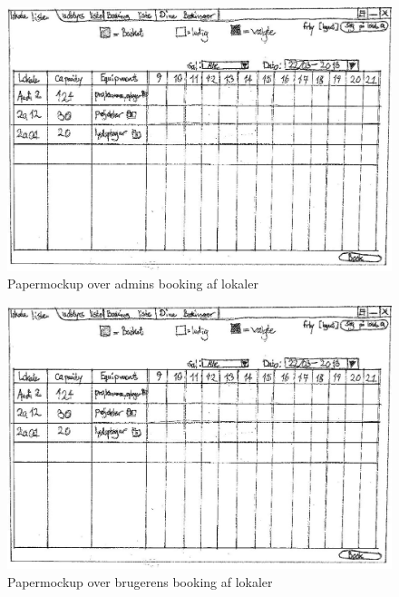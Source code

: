 \begin{figure}[h!]
  \centering
    \includegraphics[width=\textwidth]{Appendix/GUI-Prototype/PaperMockup/LokaleListeSuper_001}
  \caption{Papermockup over admins booking af lokaler}
\label{App_GUI_paper_LokaleListeSuper}
\end{figure}

\begin{figure}[h!]
  \centering
    \includegraphics[width=\textwidth]{Appendix/GUI-Prototype/PaperMockup/LokaleListe_001}
  \caption{Papermockup over brugerens booking af lokaler}
\label{App_GUI_paper_LokaleListe}
\end{figure}


